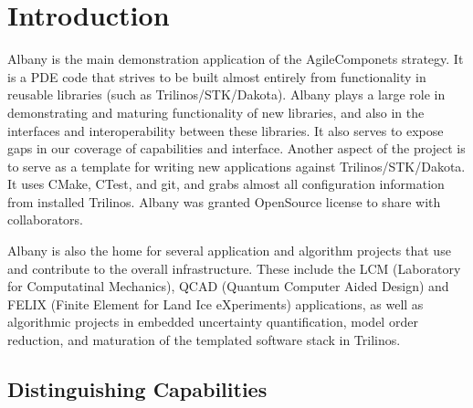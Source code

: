 \documentclass[pdf,12pt,report,strict]{SANDreport}
\theoremstyle{remark}
\begin{document}


%
\SANDmain           %

\chapter{Introduction}
\label{Intro}

Albany is the main demonstration application of the AgileComponets
strategy. It is a PDE code that strives to be built almost entirely
from functionality in reusable libraries (such as
Trilinos/STK/Dakota). Albany plays a large role in demonstrating and
maturing functionality of new libraries, and also in the interfaces
and interoperability between these libraries. It also serves to expose
gaps in our coverage of capabilities and interface. Another aspect of
the project is to serve as a template for writing new applications
against Trilinos/STK/Dakota. It uses CMake, CTest, and git, and grabs
almost all configuration information from installed Trilinos. Albany
was granted OpenSource license to share with collaborators.

Albany is also the home for several application and algorithm
projects that use and contribute to the overall infrastructure.
These include the LCM (Laboratory for Computatinal Mechanics),
QCAD (Quantum Computer Aided Design) and FELIX (Finite Element for
Land Ice eXperiments) applications, as well as algorithmic projects
in embedded uncertainty quantification, model order reduction, and
maturation of the templated software stack in Trilinos.


\section{Distinguishing Capabilities}
\end{document}
